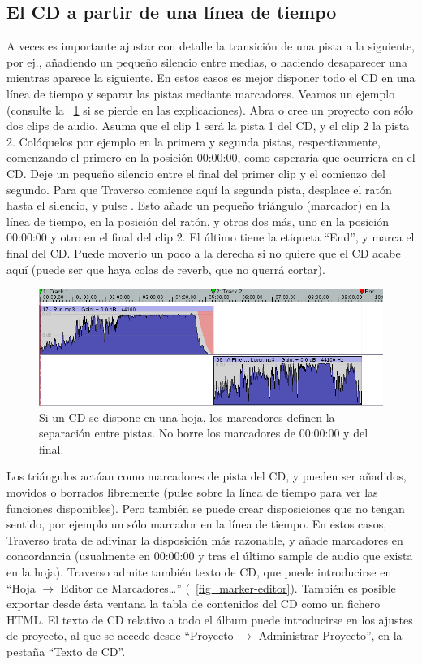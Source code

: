 \subsection{El CD a partir de una línea de tiempo}
A veces es importante ajustar con detalle la transición de una pista a la siguiente, por ej., añadiendo un pequeño silencio entre medias, o haciendo desaparecer una mientras aparece la siguiente. En estos casos es mejor disponer todo el CD en una línea de tiempo y separar las pistas mediante marcadores. Veamos un ejemplo (consulte la \FigT~\ref{fig_markers01} si se pierde en las explicaciones). Abra o cree un proyecto con sólo dos clips de audio. Asuma que el clip 1 será la pista 1 del CD, y el clip 2 la pista 2. Colóquelos por ejemplo en la primera y segunda pistas, respectivamente, comenzando el primero en la posición 00:00:00, como esperaría que ocurriera en el CD. Deje un pequeño silencio entre el final del primer clip y el comienzo del segundo. Para que Traverso comience aquí la segunda pista, desplace el ratón hasta el silencio, y pulse . Esto añade un pequeño triángulo (marcador) en la línea de tiempo, en la posición del ratón, y otros dos más, uno en la posición 00:00:00 y otro en el final del clip 2. El último tiene la etiqueta ``End'', y marca el final del CD. Puede moverlo un poco a la derecha si no quiere que el CD acabe aquí (puede ser que haya colas de reverb, que no querrá cortar).

\begin{figure}[t]
 \centering\includegraphics[width=\textwidth]{../images/markers01}
 \caption{Si un CD se dispone en una hoja, los marcadores definen la separación entre pistas. No borre los marcadores de 00:00:00 y del final.}
 \label{fig_markers01}
\end{figure}

Los triángulos actúan como marcadores de pista del CD, y pueden ser añadidos, movidos o borrados libremente (pulse  sobre la línea de tiempo para ver las funciones disponibles). Pero también se puede crear disposiciones que no tengan sentido, por ejemplo un sólo marcador en la línea de tiempo. En estos casos, Traverso trata de adivinar la disposición más razonable, y añade marcadores en concordancia (usualmente en 00:00:00 y tras el último sample de audio que exista en la hoja). Traverso admite también texto de CD, que puede introducirse en ``Hoja $\rightarrow$ Editor de Marcadores\dots'' (\FigB~\ref{fig_marker-editor}). También es posible exportar desde ésta ventana la tabla de contenidos del CD como un fichero HTML. El texto de CD relativo a todo el álbum puede introducirse en los ajustes de proyecto, al que se accede desde ``Proyecto $\rightarrow$ Administrar Proyecto'', en la pestaña ``Texto de CD''.

